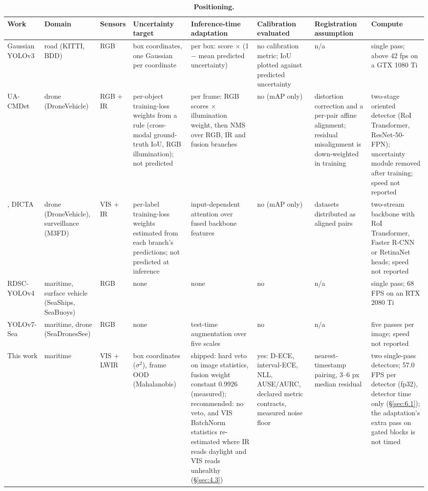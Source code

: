 \documentclass[10pt]{article}
\begin{document}
\begin{table}[htbp]
\centering
\scriptsize
\caption{\textbf{Positioning.}}
\label{tab:R}
\setlength{\tabcolsep}{3pt}
\begin{tabularx}{\linewidth}{>{\raggedright\arraybackslash}X>{\raggedright\arraybackslash}Xl>{\raggedright\arraybackslash}X>{\raggedright\arraybackslash}X>{\raggedright\arraybackslash}X>{\raggedright\arraybackslash}X>{\raggedright\arraybackslash}X}
\toprule
Work & Domain & Sensors & Uncertainty target & Inference-time adaptation & Calibration evaluated & Registration assumption & Compute \\
\midrule
Gaussian YOLOv3 \citep{choi2019gaussian} & road (KITTI, BDD) & RGB & box coordinates, one Gaussian per coordinate & per box: score $\times$ (1 $-$ mean predicted uncertainty) & no calibration metric; IoU plotted against predicted uncertainty & n/a & single pass; above 42 fps on a GTX 1080 Ti \\
UA-CMDet \citep{sun2022dronebased} & drone (DroneVehicle) & RGB + IR & per-object training-loss weights from a rule (cross-modal ground-truth IoU, RGB illumination); not predicted & per frame: RGB scores $\times$ illumination weight, then NMS over RGB, IR and fusion branches & no (mAP only) & distortion correction and a per-pair affine alignment; residual misalignment is down-weighted in training & two-stage oriented detector (RoI Transformer, ResNet-50-FPN); uncertainty module removed after training; speed not reported \\
\citet{zhao2024uncertaintyaware}, DICTA & drone (DroneVehicle), surveillance (M3FD) & VIS + IR & per-label training-loss weights estimated from each branch's predictions; not predicted at inference & input-dependent attention over fused backbone features & no (mAP only) & datasets distributed as aligned pairs & two-stream backbone with RoI Transformer, Faster R-CNN or RetinaNet heads; speed not reported \\
RDSC-YOLOv4 \citep{liu2021sea} & maritime, surface vehicle (SeaShips, SeaBuoys) & RGB & none & none & no & n/a & single pass; 68 FPS on an RTX 2080 Ti \\
YOLOv7-Sea \citep{zhao2023yolov7sea} & maritime, drone (SeaDronesSee) & RGB & none & test-time augmentation over five scales & no & n/a & five passes per image; speed not reported \\
This work & maritime & VIS + LWIR & box coordinates ($\sigma$$^{2}$), frame OOD (Mahalanobis) & shipped: hard veto on image statistics, fusion weight constant 0.9926 (measured); recommended: no veto, and VIS BatchNorm statistics re-estimated where IR reads daylight and VIS reads unhealthy (\S\ref{sec:4.3}) & yes: D-ECE, interval-ECE, NLL, AUSE/AURC, declared metric contracts, measured noise floor & nearest-timestamp pairing, 3--6 px median residual & two single-pass detectors; 57.0 FPS per detector (fp32), detector time only (\S\ref{sec:6.1}); the adaptation's extra pass on gated blocks is not timed \\
\bottomrule
\end{tabularx}
\end{table}
\FloatBarrier
\end{document}
